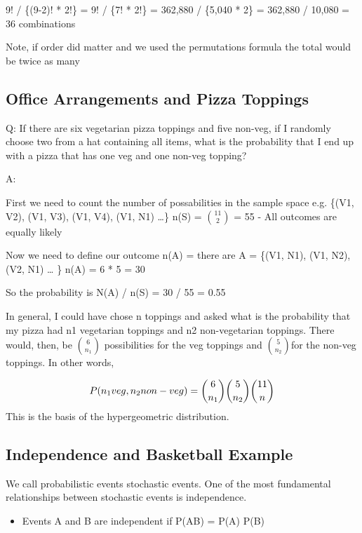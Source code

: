 \documentclass[]{book}
\providecommand{\tightlist}{%
  \setlength{\itemsep}{0pt}\setlength{\parskip}{0pt}}
\theoremstyle{definition}
\theoremstyle{definition}
\theoremstyle{definition}
\theoremstyle{remark}
\begin{document}
9! / \{(9-2)! * 2!\} = 9! / \{7! * 2!\} = 362,880 / \{5,040 * 2\} =
362,880 / 10,080 = 36 combinations

Note, if order did matter and we used the permutations formula the total
would be twice as many

\subsection{Office Arrangements and Pizza
Toppings}\label{office-arrangements-and-pizza-toppings}

Q: If there are six vegetarian pizza toppings and five non-veg, if I
randomly choose two from a hat containing all items, what is the
probability that I end up with a pizza that has one veg and one non-veg
topping?

A:

First we need to count the number of possabilities in the sample space
e.g. \{(V1, V2), (V1, V3), (V1, V4), (V1, N1) \ldots{}\} n(S) =
\(\binom{11}{2}\) = 55 - All outcomes are equally likely

Now we need to define our outcome n(A) = there are A = \{(V1, N1), (V1,
N2), (V2, N1) \ldots{} \} n(A) = 6 * 5 = 30

So the probability is N(A) / n(S) = 30 / 55 = 0.55

In general, I could have chose n toppings and asked what is the
probability that my pizza had n1 vegetarian toppings and n2
non-vegetarian toppings. There would, then, be \(\binom{6}{n_1}\)
possibilities for the veg toppings and \(\binom{5}{n_2}\)for the non-veg
toppings. In other words,

\[P(n_1 veg, n_2  non-veg)=  \binom{6}{n_1} \binom{5}{n_2} \\ \binom{11}{n}\]
This is the basis of the hypergeometric distribution.

\subsection{Independence and Basketball
Example}\label{independence-and-basketball-example}

We call probabilistic events stochastic events. One of the most
fundamental relationships between stochastic events is independence.

\begin{itemize}
\tightlist
\item
  Events A and B are independent if P(AB) = P(A) P(B)
\end{itemize}
\end{document}
